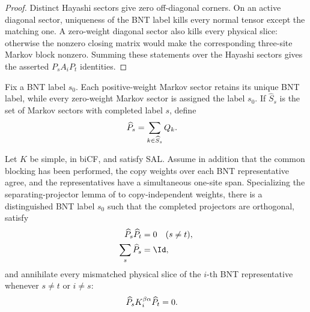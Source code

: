 \begin{proof}\leanok
    Distinct Hayashi sectors give zero off-diagonal corners. On an active
    diagonal sector, uniqueness of the BNT label kills every normal tensor
    except the matching one. A zero-weight diagonal sector also kills every
    physical slice: otherwise the nonzero closing matrix would make the
    corresponding three-site Markov block nonzero. Summing these statements
    over the Hayashi sectors gives the asserted $P_sA_iP_t$ identities.
\end{proof}

\begin{definition}
    \label{def:mpdo_completed_bnt_sector_projection}
    \leanok
    Fix a BNT label $s_0$. Each positive-weight Markov sector retains its
    unique BNT label, while every zero-weight Markov sector is assigned the
    label $s_0$. If $\widehat S_s$ is the set of Markov sectors with completed
    label $s$, define
    \begin{align}
        \widehat P_s
         & =\sum_{k\in\widehat S_s}Q_k.
        \notag
    \end{align}
\end{definition}

\begin{lemma}
    \label{thm:mpdo_sal_bnt_separating_projectors_copy_independent}
    \leanok
    Let $K$ be simple, in biCF, and satisfy SAL. Assume in addition that the
    common blocking has been performed, the copy weights over each BNT
    representative agree, and the representatives have a simultaneous
    one-site span. Specializing the separating-projector lemma of
    \cite[Appendix~C.2, lines~1680--1737]{Cirac2016MPDO_arXiv} to
    copy-independent weights, there is a distinguished BNT label $s_0$ such
    that the completed projectors are orthogonal, satisfy
    \begin{align}
        \widehat P_s\widehat P_t & =0 \quad (s\ne t),
        \notag                                        \\
        \sum_s\widehat P_s       & =\Id,
        \notag
    \end{align}
    and annihilate every mismatched physical slice of the $i$-th BNT
    representative whenever $s\ne t$ or $i\ne s$:
    \begin{align}
        \widehat P_sK_i^{\beta\alpha}\widehat P_t & =0.
        \notag
    \end{align}
\end{lemma}

